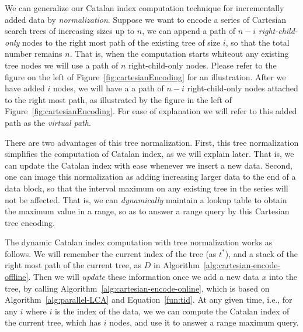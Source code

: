 We can generalize our Catalan index computation technique for
incrementally added data by {\em normalization}.  Suppose we want to
encode a series of Cartesian search trees of increasing sizes up to
$n$, we can append a path of $n-i$ {\em right-child-only} nodes to the
right most path of the existing tree of size $i$, so that the total
number remains $n$.  That is, when the computation starts whiteout any
existing tree nodes we will use a path of $n$ right-child-only nodes.
Please refer to the figure on the left of
Figure~\ref{fig:cartesianEncoding} for an illustration.  After we have
added $i$ nodes, we will have a a path of $n - i$ right-child-only
nodes attached to the right most path, as illustrated by the figure in
the left of Figure~\ref{fig:cartesianEncoding}.  For ease of
explanation we will refer to this added path as the {\em virtual
  path}.

\begin{figure*}[!thb]
  \centering {}  
  \caption{An example for difference algorithm to encode Cartesian tree.}
  \label{fig:cartesianEncoding}
\end{figure*}

There are two advantages of this tree normalization.  First, this tree
normalization simplifies the computation of Catalan index, as we will
explain later.  That is, we can update the Catalan index with ease
whenever we insert a new data.  Second, one can image this
normalization as adding increasing larger data to the end of a data
block, so that the interval maximum on any existing tree in the series
will not be affected.  That is, we can {\em dynamically} maintain a
lookup table to obtain the maximum value in a range, so as to answer a
range query by this Cartesian tree encoding.


The dynamic Catalan index computation with tree normalization works as
follows.  We will remember the current index of the tree (as $t^*$),
and a stack of the right most path of the current tree, as $D$ in
Algorithm~\ref{alg:cartesian-encode-offline}.  Then we will {\em
  update} these information once we add a new data $x$ into the tree,
by calling Algorithm~\ref{alg:cartesian-encode-online}, which is based
on Algorithm~\ref{alg:parallel-LCA} and Equation~\ref{fun:tid}.  At
any given time, i.e., for any $i$ where $i$ is the index of the data,
we we can compute the Catalan index of the current tree, which has $i$
nodes, and use it to answer a range maximum query.

